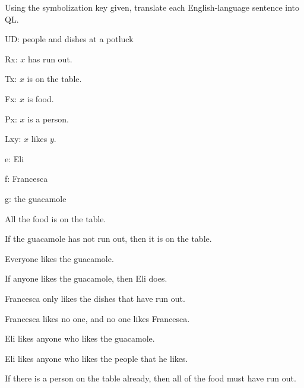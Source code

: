 \problempart
Using the symbolization key given, translate each English-language sentence into QL.
\begin{ekey}
\item[UD:] people and dishes at a potluck
\item[Rx:] $x$ has run out.
\item[Tx:] $x$ is on the table.
\item[Fx:] $x$ is food.
\item[Px:] $x$ is a person.
\item[Lxy:] $x$ likes $y$.
\item[e:] Eli
\item[f:] Francesca
\item[g:] the guacamole
\end{ekey}
\begin{earg}
\item All the food is on the table.
\item If the guacamole has not run out, then it is on the table.
\item Everyone likes the guacamole.
\item If anyone likes the guacamole, then Eli does.
\item Francesca only likes the dishes that have run out.
\item Francesca likes no one, and no one likes Francesca.
\item Eli likes anyone who likes the guacamole.
\item Eli likes anyone who likes the people that he likes.
\item If there is a person on the table already, then all of the food must have run out.
\end{earg}



